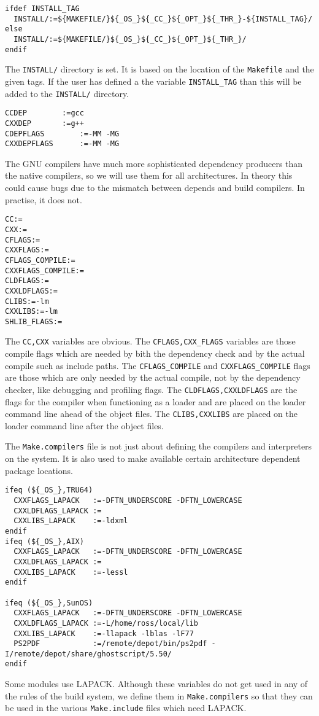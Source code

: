\documentclass{article}
\begin{document}
\begin{verbatim}
ifdef INSTALL_TAG
  INSTALL/:=${MAKEFILE/}${_OS_}${_CC_}${_OPT_}${_THR_}-${INSTALL_TAG}/
else
  INSTALL/:=${MAKEFILE/}${_OS_}${_CC_}${_OPT_}${_THR_}/
endif
\end{verbatim}
The \verb+INSTALL/+ directory is set.  It is based on the location
of the \verb+Makefile+ and the given tags.
If the user has defined a the variable \verb+INSTALL_TAG+ than this
will be added to the \verb+INSTALL/+ directory.

\begin{verbatim}
CCDEP		 :=gcc
CXXDEP		 :=g++
CDEPFLAGS        :=-MM -MG
CXXDEPFLAGS      :=-MM -MG
\end{verbatim}
The GNU compilers have much more sophisticated dependency producers than
the native compilers, so we will use them for all architectures.  In
theory this could cause bugs due to the mismatch between depends and
build compilers.  In practise, it does not.

\begin{verbatim}
CC:=
CXX:=
CFLAGS:=
CXXFLAGS:=
CFLAGS_COMPILE:=
CXXFLAGS_COMPILE:=
CLDFLAGS:=
CXXLDFLAGS:=
CLIBS:=-lm
CXXLIBS:=-lm
SHLIB_FLAGS:=
\end{verbatim}
The \verb+CC,CXX+ variables are obvious.  The \verb+CFLAGS,CXX_FLAGS+
variables are those compile flags which are needed by bith the
dependency check and by the actual compile such as
include paths.  The \verb+CFLAGS_COMPILE+
and \verb+CXXFLAGS_COMPILE+ flags are those which are only needed by
the actual compile, not by the dependency checker, like debugging
and profiling flags.  The \verb+CLDFLAGS,CXXLDFLAGS+ are the flags
for the compiler when functioning as a loader and are placed on
the loader command line ahead of the object files.  The
\verb+CLIBS,CXXLIBS+ are placed on the loader command line after the
object files.

The \verb+Make.compilers+ file is not just about defining the compilers
and interpreters on the system.  It is also used to make available certain
architecture dependent package locations.
\begin{verbatim}
ifeq (${_OS_},TRU64)
  CXXFLAGS_LAPACK   :=-DFTN_UNDERSCORE -DFTN_LOWERCASE
  CXXLDFLAGS_LAPACK :=
  CXXLIBS_LAPACK    :=-ldxml
endif
ifeq (${_OS_},AIX)
  CXXFLAGS_LAPACK   :=-DFTN_UNDERSCORE -DFTN_LOWERCASE
  CXXLDFLAGS_LAPACK :=
  CXXLIBS_LAPACK    :=-lessl
endif

ifeq (${_OS_},SunOS)
  CXXFLAGS_LAPACK   :=-DFTN_UNDERSCORE -DFTN_LOWERCASE
  CXXLDFLAGS_LAPACK :=-L/home/ross/local/lib
  CXXLIBS_LAPACK    :=-llapack -lblas -lF77
  PS2PDF            :=/remote/depot/bin/ps2pdf -I/remote/depot/share/ghostscript/5.50/
endif
\end{verbatim}
Some modules use LAPACK.  Although these variables do not get used
in any of the rules of the build system, we define them in 
\verb+Make.compilers+ so that they can be used in the various
\verb+Make.include+ files which need LAPACK.
\end{document}
